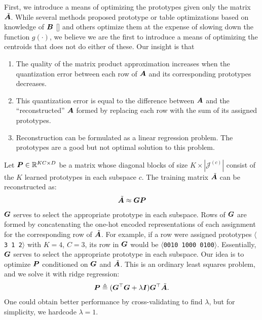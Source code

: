 First, we introduce a means of optimizing the prototypes given only the matrix $\tilde{\bm{A}}$. While several methods proposed prototype or table optimizations based on knowledge of $\bm{B}$ [] and others optimize them at the expense of slowing down the function $g(\cdot)$, we believe we are the first to introduce a means of optimizing the centroids that does not do either of these. Our insight is that
\begin{enumerate}
    \item The quality of the matrix product approximation increases when the quantization error between each row of $\bm{A}$ and its corresponding prototypes decreases.
    \item This quantization error is equal to the difference between $\bm{A}$ and the ``reconstructed'' $\bm{A}$ formed by replacing each row with the sum of its assigned prototypes.
    \item Reconstruction can be formulated as a linear regression problem. The prototypes are a good but not optimal solution to this problem.
\end{enumerate}

Let $\bm{P} \in \mathbb{R}^{KC \times D}$ be a matrix whose diagonal blocks of size $K \times |\mathcal{J}^{(c)}|$ consist of the $K$ learned prototypes in each subspace $c$. The training matrix $\tilde{\bm{A}}$ can be reconstructed as:
\begin{align}
    \tilde{\bm{A}} \approx \bm{G}\bm{P}
\end{align}
$\bm{G}$ serves to select the appropriate prototype in each subspace. Rows of $\bm{G}$ are formed by concatenating the one-hot encoded representations of each assignment for the corresponding row of $\tilde{\bm{A}}$. For example, if a row were assigned prototypes $\langle$\texttt{3 1 2}$\rangle$ with $K = 4$, $C = 3$, its row in $\bm{G}$ would be $\langle$\texttt{0010 1000 0100}$\rangle$. Essentially, $\bm{G}$ serves to select the appropriate prototype in each subspace. Our idea is to optimize $\bm{P}$ conditioned on $\bm{G}$ and $\tilde{\bm{A}}$. This is an ordinary least squares problem, and we solve it with ridge regression:
\begin{align}
    \bm{P} \triangleq (\bm{G}^\top \bm{G} + \lambda \bm{I}) \bm{G}^\top \tilde{\bm{A}}.
\end{align}
One could obtain better performance by cross-validating to find $\lambda$, but for simplicity, we hardcode $\lambda = 1$. %

